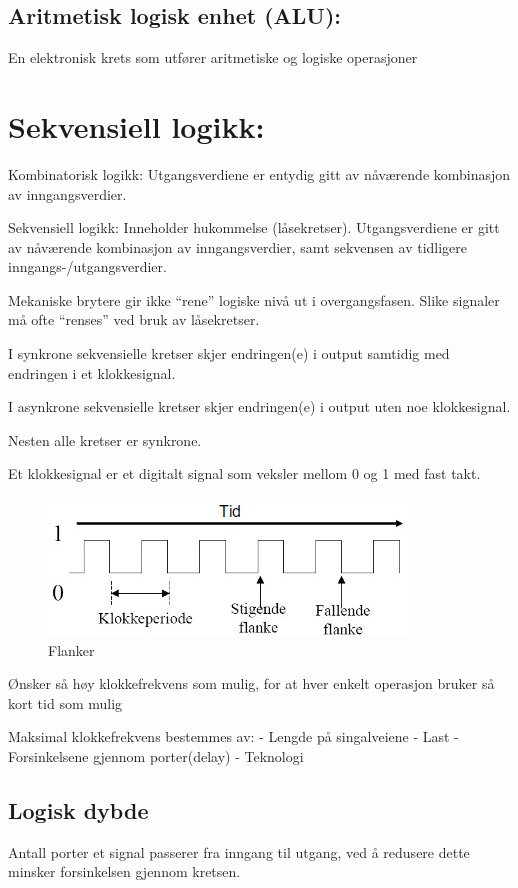 \documentclass{article}
\begin{document}
	
	\subsection{Aritmetisk logisk enhet (ALU):}
	En elektronisk krets som utfører aritmetiske og logiske operasjoner	
	
	\section{Sekvensiell logikk:}
	
	Kombinatorisk logikk:
	Utgangsverdiene er entydig gitt av nåværende kombinasjon av inngangsverdier.
	
	Sekvensiell logikk:
	Inneholder hukommelse (låsekretser). Utgangsverdiene er gitt av nåværende kombinasjon av inngangsverdier,  samt sekvensen av tidligere inngangs-­/utgangsverdier.
	
	Mekaniske brytere gir ikke “rene”  logiske nivå ut i
	overgangsfasen.  Slike signaler  må ofte “renses”  ved bruk
	av låsekretser.
	
	I synkrone  sekvensielle kretser skjer endringen(e) i output  samtidig  med endringen i et  klokkesignal. 
	 
	I  asynkrone  sekvensielle kretser skjer endringen(e) i  output  uten  noe  klokkesignal.  
	 
	Nesten alle kretser er synkrone.
	 
	Et klokkesignal er et digitalt signal som veksler mellom 0 og 1 med fast takt. 
	
	\begin{figure}[H]
		\includegraphics[scale = 0.6]{flanke.jpg}
		\caption{Flanker}
	\end{figure}
	 
	Ønsker så høy klokkefrekvens som mulig, for at hver enkelt operasjon bruker så kort tid som mulig
	 
	Maksimal klokkefrekvens bestemmes av:
	 - Lengde på singalveiene
	 - Last
	 - Forsinkelsene gjennom porter(delay)
	 - Teknologi
	 
	\subsection{Logisk dybde}
	Antall porter et signal passerer fra inngang til utgang, ved å redusere dette minsker forsinkelsen gjennom kretsen.
	
\end{document}

